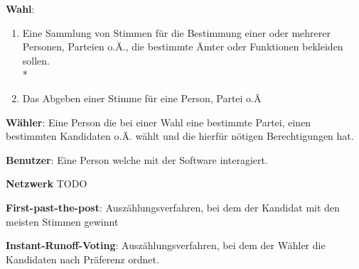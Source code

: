 \documentclass[parskip=full,11pt,twoside]{scrartcl}
\begin{document}
\textbf{Wahl}:
\begin{enumerate}
	\item Eine Sammlung von Stimmen für die Bestimmung einer oder mehrerer Personen, Parteien o.Ä., die bestimmte Ämter oder Funktionen bekleiden sollen. \\*
	\item Das Abgeben einer Stimme für eine Person, Partei o.Ä
\end{enumerate}

\textbf{Wähler}:
Eine Person die bei einer Wahl eine bestimmte Partei, einen bestimmten Kandidaten o.Ä. wählt und die hierfür nötigen Berechtigungen hat.

\textbf{Benutzer}:
Eine Person welche mit der Software interagiert.

\textbf{Netzwerk}
TODO

\textbf{First-past-the-post}:
Auszählungsverfahren, bei dem der Kandidat mit den meisten Stimmen gewinnt

\textbf{Instant-Runoff-Voting}:
Auszählungsverfahren, bei dem der Wähler die Kandidaten nach Präferenz ordnet.
\end{document}
